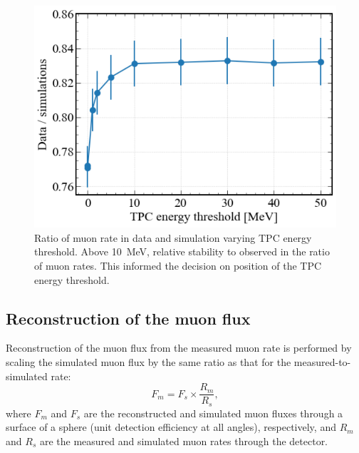\begin{figure}[h!]
    \centering
    \includegraphics[width=0.7\linewidth]{figures/Muons/Data_sims_ratio_lgonly-2.pdf}
    \caption[Ratio of muon rate in data and simulation varying TPC energy threshold.]{Ratio of muon rate in data and simulation varying TPC energy threshold. Above 10~MeV, relative stability to observed in the ratio of muon rates. This informed the decision on position of the TPC energy threshold.}
    \label{fig:Muons/MuonRatioByTPCThreshold}
\end{figure}


\subsection{Reconstruction of the muon flux}\label{sec:Muons/MuonFluxReconstruction}
Reconstruction of the muon flux from the measured muon rate is performed by scaling the simulated muon flux by the same ratio as that for the measured-to-simulated rate:
\begin{equation}
    F_{m} = F_{s} \times \frac{R_m}{R_s},
\label{eqn:Muons/flux}
\end{equation}
where $F_{m}$ and $F_{s}$ are the reconstructed and simulated muon fluxes through a surface of a sphere (unit detection efficiency at all angles), respectively, and $R_{m}$ and $R_{s}$ are the measured and simulated muon rates through the detector.

